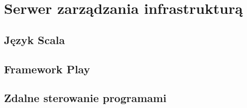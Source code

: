 \section{Serwer zarządzania infrastrukturą}

\subsection{Język Scala}

\subsection{Framework Play}

\subsection{Zdalne sterowanie programami}


